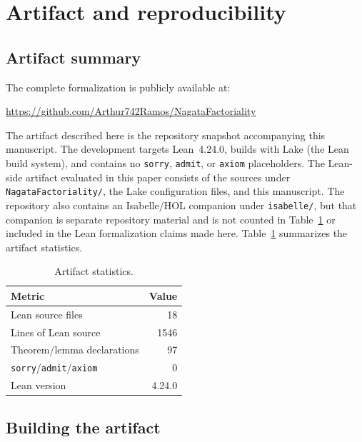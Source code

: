 \documentclass[11pt]{article}
\theoremstyle{plain}
\theoremstyle{definition}
\theoremstyle{remark}
\newcommand{\li}[1]{\texorpdfstring{\texttt{#1}}{#1}}
\newcommand{\lf}[1]{\texorpdfstring{\nolinkurl{#1}}{#1}}
\begin{document}
\section{Artifact and reproducibility}\label{sec:artifact}

\subsection{Artifact summary}

The complete formalization is publicly available at:
\begin{center}
\url{https://github.com/Arthur742Ramos/NagataFactoriality}
\end{center}
The artifact described here is the repository snapshot accompanying this
manuscript.  The development targets Lean~4.24.0, builds with Lake (the Lean
build system), and contains no \li{sorry}, \li{admit}, or \li{axiom}
placeholders.  The Lean-side artifact evaluated in this paper consists of the
sources under \lf{NagataFactoriality/}, the Lake configuration files, and this
manuscript.  The repository also contains an Isabelle/HOL companion under
\lf{isabelle/}, but that companion is separate repository material and is not
counted in Table~\ref{tab:stats} or included in the Lean formalization claims
made here.
Table~\ref{tab:stats} summarizes the artifact statistics.

\begin{table}[ht]
\centering
\caption{Artifact statistics.}\label{tab:stats}
\smallskip
\begin{tabular}{@{}lr@{}}
\toprule
\textbf{Metric} & \textbf{Value} \\
\midrule
Lean source files              & 18   \\
Lines of Lean source           & 1546 \\
Theorem/lemma declarations     & 97   \\
\li{sorry}/\li{admit}/\li{axiom} & 0   \\
Lean version                   & 4.24.0 \\
\bottomrule
\end{tabular}
\end{table}

\subsection{Building the artifact}
\end{document}
